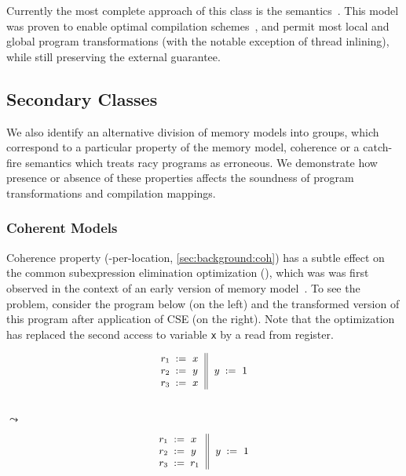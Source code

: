 Currently the most complete approach of this class 
is the \Promising semantics~\cite{Kang-al:POPL17, Lee-al:PLDI20}. 
This model was proven to enable optimal compilation schemes~\cite{Podkopaev-al:POPL19}, 
and permit most local and global program transformations
(with the notable exception of thread inlining), 
while still preserving the external \DRF guarantee.

\subsection{Secondary Classes}
\label{sec:analysis:other}

We also identify an alternative division of memory models into groups, 
which correspond to a particular property of the memory model, 
\eg coherence or a catch-fire semantics which treats racy programs 
as erroneous. We demonstrate how presence or absence of these properties 
affects the soundness of program transformations and compilation mappings.

\subsubsection{Coherent Models}
\label{sec:analysis:coh}

Coherence property (\ie \SC-per-location, \cref{sec:background:coh})
has a subtle effect on the common subexpression elimination optimization (\CSE),
which was was first observed in the context of an early version of \Java 
memory model~\cite{Pugh:JAVA99}.
To see the problem, consider the program below
(on the left) and the transformed version 
of this program after application of CSE (on the right).
Note that the optimization has replaced 
the second access to variable \texttt{x}
by a read from register. 

\begin{minipage}{0.45\linewidth}
\begin{equation*}
\small
\inarrII{
  \readInst{}{r_1}{x}      \\
  \readInst{}{r_2}{y}      \\
  \readInst{}{r_3}{x}      \\
}{
  \writeInst{}{y}{1}       \\
}
\label{ex:coh-rr}
\end{equation*}
\end{minipage}\hfill%
\begin{minipage}{0.05\linewidth}
\Large~\\ $\leadsto$
\end{minipage}\hfill%
\begin{minipage}{0.45\linewidth}
\begin{equation*}
\small
\inarrII{
  \readInst{}{r_1}{x}      \\
  \readInst{}{r_2}{y}      \\
  \assignInst{r_3}{r_1}    \\
}{
  \writeInst{}{y}{1}       \\
}
\label{ex:coh-rr}
\end{equation*}
\end{minipage}


